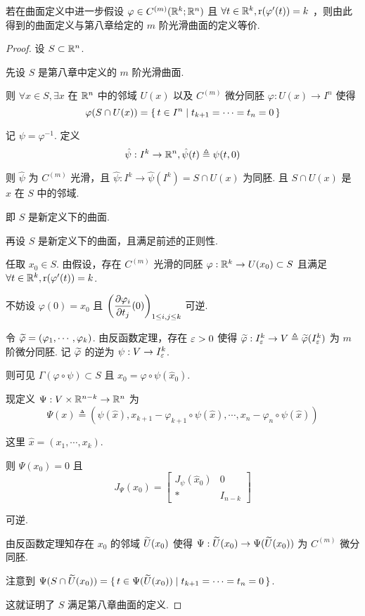 \begin{property}
若在曲面定义中进一步假设 $\varphi\in C^{(m)}(\mathbb{R}^k;\mathbb{R}^n)$ 且 $\forall t\in\mathbb{R}^k,\mathrm{r}(\varphi'(t))=k$ ，则由此得到的曲面定义与第八章给定的 $m$ 阶光滑曲面的定义等价.
\end{property}
\begin{proof}
设 $S\subset\mathbb{R}^n$.

先设 $S$ 是第八章中定义的 $m$ 阶光滑曲面.

则 $\forall x\in S,\exists x$ 在 $\mathbb{R}^n$ 中的邻域 $U(x)$ 以及 $C^{(m)}$ 微分同胚 $\varphi:U(x)\to I^n$ 使得
$$
\varphi(S\cap U(x))=\set{t\in I^n|t_{k+1}=\cdots=t_n=0}
$$

记 $\psi=\varphi^{-1}$. 定义
$$
\hat\psi:I^k\to\mathbb{R}^n,\hat\psi(t)\triangleq\psi(t,0)
$$

则 $\hat\psi$ 为 $C^{(m)}$ 光滑，且 $\hat\psi:I^k\to\hat\psi(I^k)=S\cap U(x)$ 为同胚. 且 $S\cap U(x)$ 是 $x$ 在 $S$ 中的邻域.

即 $S$ 是新定义下的曲面.

再设 $S$ 是新定义下的曲面，且满足前述的正则性.

任取 $x_0\in S$. 由假设，存在 $C^{(m)}$ 光滑的同胚 $\varphi:\mathbb{R}^k\to U(x_0)\subset S$ 且满足 $\forall t\in\mathbb{R}^k,\mathrm{r}(\varphi'(t))=k$.

不妨设 $\varphi(0)=x_0$ 且 $\displaystyle\left(\frac{\partial{\varphi_i}}{\partial{t_j}}(0)\right)_{1\le i,j\le k}$ 可逆.

令 $\widetilde\varphi=(\varphi_1,\cdots,\varphi_k)$.
由反函数定理，存在 $\varepsilon>0$ 使得 $\widetilde\varphi:I_\varepsilon^k\to V\triangleq\widetilde\varphi(I_\varepsilon^k)$ 为 $m$ 阶微分同胚.
记 $\widetilde\varphi$ 的逆为 $\psi:V\to I_\varepsilon^k$.


则可见 $\Gamma(\varphi\circ\psi)\subset S$ 且 $x_0=\varphi\circ\psi(\hat{x}_0)$.

现定义 $\Psi:V\times \mathbb{R}^{n-k}\to \mathbb{R}^n$ 为
$$
\Psi(x)\triangleq(\psi(\hat{x}),x_{k+1}-\varphi_{k+1}\circ\psi(\hat{x}),\cdots,x_n-\varphi_n\circ\psi(\hat{x}))
$$

这里 $\hat{x}=(x_1,\cdots,x_k)$.

则 $\Psi(x_0)=0$ 且
$$
J_\Psi(x_0)=\begin{bmatrix}
    J_\psi(\hat{x}_0) & 0 \\
    \ast & I_{n-k}
\end{bmatrix}
$$

可逆.

由反函数定理知存在 $x_0$ 的邻域 $\widetilde U(x_0)$ 使得 $\Psi:\widetilde U(x_0)\to\Psi(\widetilde U(x_0))$ 为 $C^{(m)}$ 微分同胚.

注意到 $\Psi(S\cap\widetilde U(x_0))=\set{t\in\Psi(\widetilde U(x_0))|t_{k+1}=\cdots=t_n=0}$.

这就证明了 $S$ 满足第八章曲面的定义.
\end{proof}

